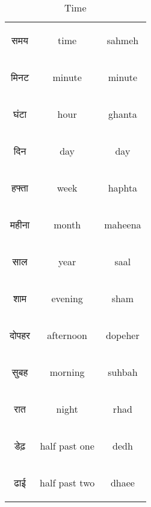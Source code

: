 \begin{table}[H]
    \centering
    \begin{tabular}{c|c|c}
\begin{hindi} समय \end{hindi} & time & sahmeh \\  
\begin{hindi} मिनट \end{hindi} & minute & minute \\  
\begin{hindi} घंटा \end{hindi} & hour & ghanta \\ 
\begin{hindi} दिन \end{hindi} & day & day \\ 
\begin{hindi} हफ्ता \end{hindi} & week & haphta \\ 
\begin{hindi} महीना \end{hindi} & month & maheena \\ 
\begin{hindi} साल \end{hindi} & year & saal \\ 
\begin{hindi} शाम \end{hindi} & evening & sham \\ 
\begin{hindi} दोपहर \end{hindi} & afternoon & dopeher \\ 
\begin{hindi} सुबह \end{hindi} & morning & suhbah \\ 
\begin{hindi} रात \end{hindi} & night & rhad \\ 
\begin{hindi} डेढ़ \end{hindi} & half past one & dedh \\ 
\begin{hindi} ढाई \end{hindi} & half past two & dhaee \\ 
    \end{tabular}
    \caption{Time}
    \label{tab:nouns_time}
\end{table}

